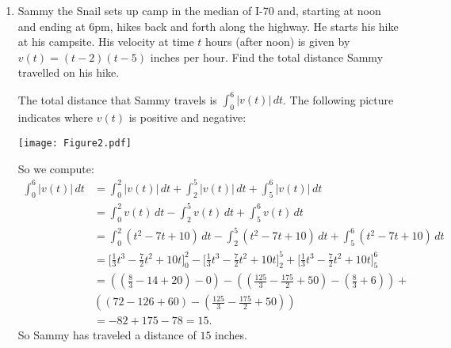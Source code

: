 \documentclass[nooutcomes, handout]{ximera}
\renewcommand{\d}{\,d}
\newcommand{\eval}[1]{\bigg[ #1 \bigg]}
\begin{document}
\begin{problem}
\begin{enumerate}
	\item  Sammy the Snail sets up camp in the median of I-70 and, starting at noon and ending at 6pm, hikes back and forth along the highway.  He starts his hike at his campsite.  His velocity at time $t$ hours (after noon)  is given by $v(t)=(t-2)(t-5)$ inches per hour.  Find the total distance Sammy travelled on his hike.  
		\begin{freeResponse}
		The total distance that Sammy travels is $\int_0^6 \left| v(t) \right| \d t$.  
		The following picture indicates where $v(t)$ is positive and negative:
			\begin{image}
			\texttt{[image: Figure2.pdf]}
			\end{image}
		So we compute:
			\begin{align*}
			\int_0^6 \left| v(t) \right| \d t &= \int_0^2 \left| v(t) \right| \d t + \int_2^5 \left| v(t) \right| \d t + \int_5^6 \left| v(t) \right| \d t  \\
			&= \int_0^2 v(t) \d t - \int_2^5 v(t) \d t + \int_5^6 v(t) \d t  \\
			&= \int_0^2 (t^2 - 7t + 10) \d t - \int_2^5 (t^2 - 7t + 10) \d t + \int_5^6 (t^2 - 7t + 10) \d t  \\
			&= \eval{\frac{1}{3}t^3-\frac{7}{2}t^2+10t}_0^2-\eval{\frac{1}{3}t^3-\frac{7}{2}t^2+10t}_2^5+\eval{\frac{1}{3}t^3-\frac{7}{2}t^2+10t}_5^6  \\
			&= \left( \left(\frac{8}{3}-14+20 \right)-0\right)-\left( \left( \frac{125}{3}-\frac{175}{2}+50 \right)-\left( \frac{8}{3}+6 \right) \right)+  \\
			&\left( \left( 72-126+60 \right) - \left( \frac{125}{3} - \frac{175}{2} + 50 \right) \right)  \\
			&= -82+175-78=15.
			\end{align*}
		So Sammy has traveled a distance of $15$ inches.
		\end{freeResponse}
		
		
		
	\end{enumerate}
		
		
\end{problem}








	
	
	
	
	
	
	
	
\end{document}
